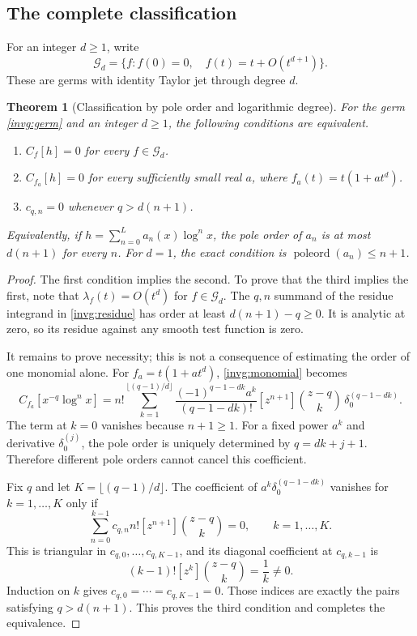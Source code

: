 \documentclass[11pt,a4paper]{article}
\newtheorem{theorem}{Theorem}[section]
\theoremstyle{definition}
\theoremstyle{remark}
\numberwithin{equation}{section}
\begin{document}
\subsection{The complete classification}

For an integer $d\ge1$, write
\[
 \mathscr G_d=\{f:f(0)=0,\quad f(t)=t+O(t^{d+1})\}.
\]
These are germs with identity Taylor jet through degree $d$.

\begin{theorem}[Classification by pole order and logarithmic degree]
\label{invg:classification}
For the germ \eqref{invg:germ} and an integer $d\ge1$, the following
conditions are equivalent.
\begin{enumerate}
\item $C_f[h]=0$ for every $f\in\mathscr G_d$.
\item $C_{f_a}[h]=0$ for every sufficiently small real $a$, where
      $f_a(t)=t(1+a t^d)$.
\item $c_{q,n}=0$ whenever $q>d(n+1)$.
\end{enumerate}
Equivalently, if $h=\sum_{n=0}^{L}a_n(x)\log^n x$, the pole order of
$a_n$ is at most $d(n+1)$ for every $n$.  For $d=1$, the exact condition
is $\operatorname{poleord}(a_n)\le n+1$.
\end{theorem}

\begin{proof}
The first condition implies the second.  To prove that the third implies
the first, note that $\lambda_f(t)=O(t^d)$ for $f\in\mathscr G_d$.
The $q,n$ summand of the residue integrand in \eqref{invg:residue} has
order at least $d(n+1)-q\ge0$.  It is analytic at zero, so its residue
against any smooth test function is zero.

It remains to prove necessity; this is not a consequence of estimating
the order of one monomial alone.  For $f_a=t(1+a t^d)$,
\eqref{invg:monomial} becomes
\begin{equation}\label{invg:quadratic-family}
 C_{f_a}[x^{-q}\log^n x]
 =n!\sum_{k=1}^{\lfloor(q-1)/d\rfloor}
 \frac{(-1)^{q-1-dk}a^k}{(q-1-dk)!}
 [z^{n+1}]\binom{z-q}{k}\,\delta_0^{(q-1-dk)}.
\end{equation}
The term at $k=0$ vanishes because $n+1\ge1$.
For a fixed power $a^k$ and derivative $\delta_0^{(j)}$, the pole order
is uniquely determined by $q=dk+j+1$.  Therefore different pole orders
cannot cancel this coefficient.

Fix $q$ and let $K=\lfloor(q-1)/d\rfloor$.  The coefficient of
$a^k\delta_0^{(q-1-dk)}$ vanishes for $k=1,\ldots,K$ only if
\begin{equation}\label{invg:triangular}
 \sum_{n=0}^{k-1}c_{q,n}n![z^{n+1}]\binom{z-q}{k}=0,
 \qquad k=1,\ldots,K.
\end{equation}
This is triangular in $c_{q,0},\ldots,c_{q,K-1}$, and its diagonal
coefficient at $c_{q,k-1}$ is
\[
 (k-1)![z^k]\binom{z-q}{k}=\frac1k\ne0.
\]
Induction on $k$ gives $c_{q,0}=\cdots=c_{q,K-1}=0$.
Those indices are exactly the pairs satisfying $q>d(n+1)$.
This proves the third condition and completes the equivalence.
\end{proof}
\end{document}
